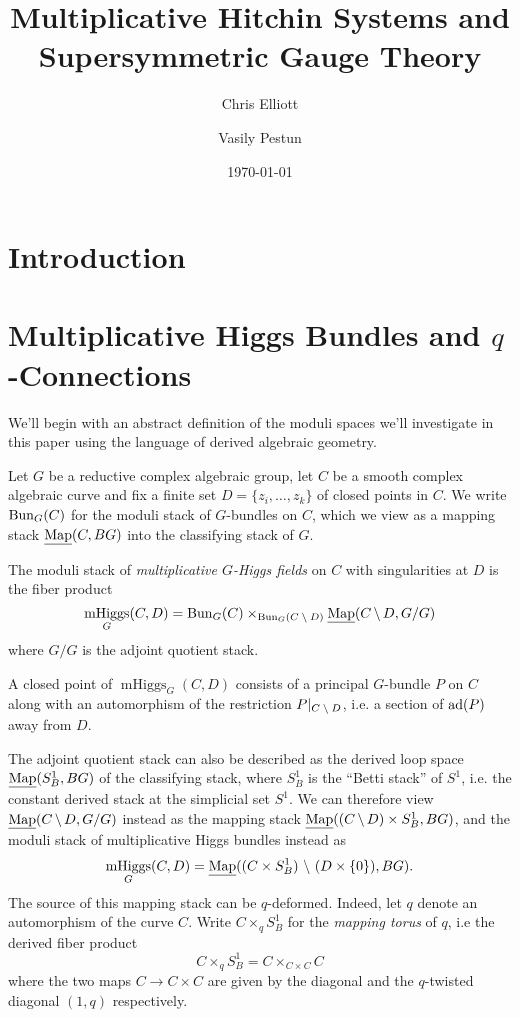 \documentclass[10pt, oneside]{article}
\title{Multiplicative Hitchin Systems and Supersymmetric Gauge Theory}
\author{Chris Elliott \and Vasily Pestun}
\date{\today}
\DeclareMathOperator{\mhiggs}{mHiggs}
\newcommand{\map}{\ul{\mr{Map}}}
\renewcommand{\ad}{\mr{ad}}
\begin{document}
\maketitle 
\begin{abstract}
 
\end{abstract}

\section{Introduction}

\section{Multiplicative Higgs Bundles and $q$-Connections}
We'll begin with an abstract definition of the moduli spaces we'll investigate in this paper using the language of derived algebraic geometry.

Let $G$ be a reductive complex algebraic group, let $C$ be a smooth complex algebraic curve and fix a finite set $D = \{z_i, \ldots, z_k\}$ of closed points in $C$.  We write $\operatorname{Bun}_G(C)$ for the moduli stack of $G$-bundles on $C$, which we view as a mapping stack $\map(C, BG)$ into the classifying stack of $G$.

\begin{definition}
The moduli stack of \emph{multiplicative $G$-Higgs fields} on $C$ with singularities at $D$ is the fiber product
\[\mhiggs_G(C,D) = \bun_G(C) \times_{\bun_G(C \! \bs \! D)} \map(C \! \bs \! D, G/G)\]
where $G/G$ is the adjoint quotient stack.
\end{definition}

\begin{remark}
A closed point of $\mhiggs_G(C,D)$ consists of a principal $G$-bundle $P$ on $C$ along with an automorphism of the restriction $P|_{C \! \ \backslash \  \! D}$, i.e. a section of $\ad(P)$ away from $D$.
\end{remark}

The adjoint quotient stack can also be described as the derived loop space $\map(S^1_B, BG)$ of the classifying stack, where $S^1_B$ is the ``Betti stack'' of $S^1$, i.e. the constant derived stack at the simplicial set $S^1$.  We can therefore view $\map(C \! \bs \! D, G/G)$ instead as the mapping stack $\map((C \! \bs \! D) \times S^1_B, BG)$, and the moduli stack of multiplicative Higgs bundles instead as
\[\mhiggs_G(C,D) = \map((C \times S^1_B) \bs (D \times \{0\}), BG).\]  
The source of this mapping stack can be $q$-deformed.  Indeed, let $q$ denote an automorphism of the curve $C$.  Write $C \times_q S^1_B$ for the \emph{mapping torus} of $q$, i.e the derived fiber product
\[C \times_q S^1_B = C \times_{C \times C} C\]
where the two maps $C \to C \times C$ are given by the diagonal and the $q$-twisted diagonal $(1,q)$ respectively.
\end{document}
